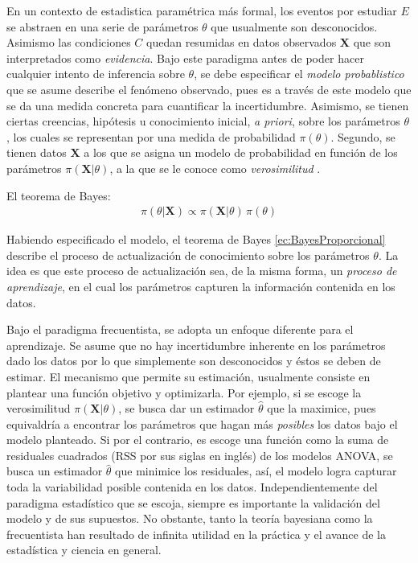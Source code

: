 \documentclass[../Main/Main.tex]{subfiles}
\begin{document}
En un contexto de estadistica paramétrica más formal, los eventos por estudiar $E$ se abstraen en una serie de parámetros $\theta$ que usualmente son desconocidos. Asimismo las condiciones $C$ quedan resumidas en datos observados $\mathbf{X}$ que son interpretados como \textit{evidencia}. 
Bajo este paradigma antes de poder hacer cualquier intento de inferencia sobre $\theta$, se debe especificar el \textit{modelo probablistico} que se asume describe el fenómeno observado, pues es a través de este modelo que se da una medida concreta para cuantificar la incertidumbre. Asimismo, se tienen ciertas creencias, hipótesis u conocimiento inicial, \textit{a priori}, sobre los parámetros $\theta$, los cuales se representan por una medida de probabilidad $\pi(\theta)$. Segundo, se tienen datos $\mathbf{X}$ a los que se asigna un modelo de probabilidad en función de los parámetros $\pi(\mathbf{X}|\theta)$, a la que se le conoce como \textit{verosimilitud} \autocite{bernardo2003bayesian}.\\
\begin{theorem}
El teorema de Bayes:
\begin{align} 
	\pi(\theta|\mathbf{X}) \propto \pi(\mathbf{X}|\theta)\,\pi(\theta)\label{ec:BayesProporcional}
\end{align}
\end{theorem}
\vspace*{-.7cm}
Habiendo especificado el modelo, el teorema de Bayes \eqref{ec:BayesProporcional} describe el proceso de actualización de conocimiento sobre los parámetros $\theta$. La idea es que este proceso de actualización sea, de la misma forma, un \textit{proceso de aprendizaje}, en el cual los parámetros capturen la información contenida en los datos.

Bajo el paradigma frecuentista, se adopta un enfoque diferente para el  aprendizaje. Se asume que no hay incertidumbre inherente en los parámetros dado los datos por lo que simplemente son desconocidos y éstos  se deben de estimar. El mecanismo que permite su estimación, usualmente consiste en plantear una función objetivo y optimizarla. Por ejemplo, si se escoge la verosimilitud $\pi(\mathbf{X}|\theta)$, se busca dar un estimador $\hat{\theta}$ que la maximice, pues equivaldría a encontrar los parámetros que hagan más \textit{posibles} los datos bajo el modelo planteado. Si por el contrario, es escoge una función como la suma de residuales cuadrados (RSS por sus siglas en inglés) de los modelos ANOVA, se busca un estimador $\hat{\theta}$ que minimice los residuales, así, el modelo logra capturar toda la variabilidad posible contenida en los datos. Independientemente del paradigma estadístico que se escoja, siempre es importante la validación del modelo y de sus supuestos. No obstante, tanto la teoría bayesiana como la frecuentista han resultado de infinita utilidad en la práctica y el avance de la estadística y ciencia en general.
\end{document}
